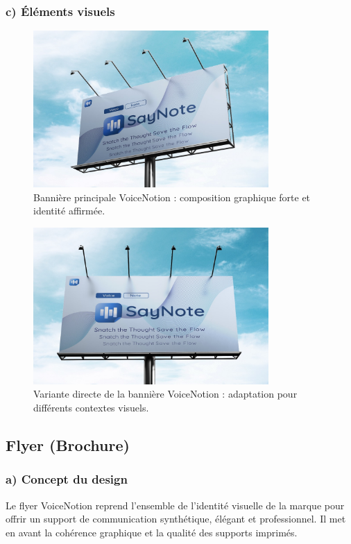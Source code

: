 \subsubsection*{c) Éléments visuels}
\begin{figure}[H]
    \centering
    \includegraphics[width=0.8\textwidth]{docs/visual-indentity/pictures/big-banner.jpg}
    \caption{Bannière principale VoiceNotion : composition graphique forte et identité affirmée.}
\end{figure}
\begin{figure}[H]
    \centering
    \includegraphics[width=0.8\textwidth]{docs/visual-indentity/pictures/big-banner-directly .jpg}
    \caption{Variante directe de la bannière VoiceNotion : adaptation pour différents contextes visuels.}
\end{figure}

\subsection{Flyer (Brochure)}
\subsubsection*{a) Concept du design}
Le flyer VoiceNotion reprend l’ensemble de l’identité visuelle de la marque pour offrir un support de communication synthétique, élégant et professionnel. Il met en avant la cohérence graphique et la qualité des supports imprimés.

